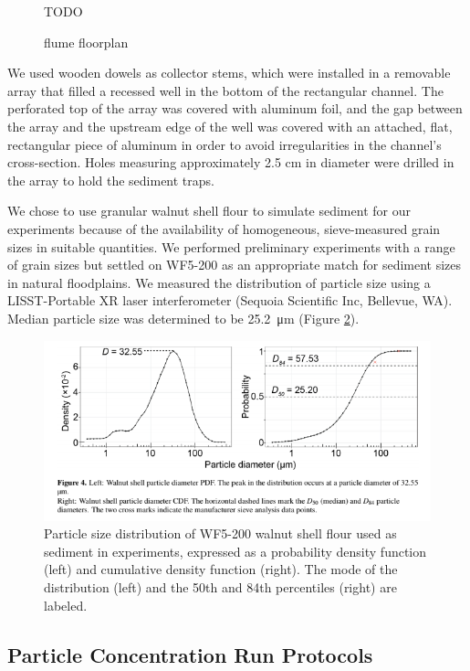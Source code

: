 \documentclass[parskip=full-]{scrreprt}
\begin{document}
\begin{figure}[htbp]
TODO
\centering
\caption{flume floorplan}
\label{fig:floorplan}
\end{figure}

We used wooden dowels as collector stems, which were installed in a removable array that filled a recessed well in the bottom of the rectangular channel. The perforated top of the array was covered with aluminum foil, and the gap between the array and the upstream edge of the well was covered with an attached, flat, rectangular piece of aluminum in order to avoid irregularities in the channel's cross-section. Holes measuring approximately 2.5 cm in diameter were drilled in the array to hold the sediment traps.

We chose to use granular walnut shell flour to simulate sediment for our experiments because of the availability of homogeneous, sieve-measured grain sizes in suitable quantities. We performed preliminary experiments with a range of grain sizes but settled on WF5-200 as an appropriate match for sediment sizes in natural floodplains. We measured the distribution of particle size using a LISST-Portable XR laser interferometer (Sequoia Scientific Inc, Bellevue, WA). Median particle size was determined to be \SI{25.2}{\micro\metre} (Figure \ref{fig:sedsize}).

\begin{figure}[htbp]
\includegraphics[width=15cm,trim = {0 3cm 0 0},clip]{wf5-200sizedist.png}
\centering
\caption{Particle size distribution of WF5-200 walnut shell flour used as sediment in experiments, expressed as a probability density function (left) and cumulative density function (right). The mode of the distribution (left) and the 50th and 84th percentiles (right) are labeled.}
\label{fig:sedsize}
\end{figure}

\subsection{Particle Concentration Run Protocols}
\end{document}
